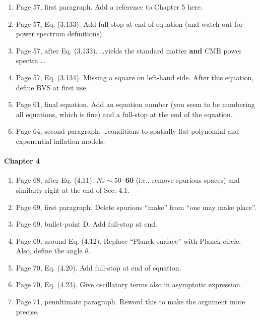 \documentclass[11pt]{article}
\begin{document}
\begin{enumerate}
\item Page 57, first paragraph. Add a reference to Chapter 5 here.
\item Page 57, Eq. (3.133). Add full-stop at end of equation (and
  watch out for power spectrum definitions).
\item Page 57, after Eq. (3.133). \ldots yields the standard matter
  \textbf{and} CMB power spectra \ldots
\item Page 57, Eq. (3.134). Missing a square on left-hand side. After
  this equation, define BVS at first use.
\item Page 61, final equation. Add an equation number (you seem to be
  numbering all equations, which is fine) and a full-stop at the end
  of the equation.
\item Page 64, second paragraph. \ldots conditions to spatially-flat
  polynomial and exponential inflation models.
\end{enumerate}

\paragraph{Chapter 4}
\begin{enumerate}
\item Page 68, after Eq. (4.11). $N_\ast \sim 50$\textbf{--60} (i.e.,
  remove spurious spaces) and similarly right at the end of Sec. 4.1.
\item Page 69, first paragraph. Delete spurious ``make'' from ``one
  may make place''.
\item Page 69, bullet-point D. Add full-stop at end.
\item Page 69, around Eq. (4.12). Replace ``Planck surface'' with
  Planck circle. Also, define the angle $\theta$.
\item Page 70, Eq. (4.20). Add full-stop at end of equation.
\item Page 70, Eq. (4.23). Give oscillatory terms also in asymptotic
  expression.
\item Page 71, penultimate paragraph. Reword this to make the argument
  more precise.
\end{enumerate}
\end{document}
